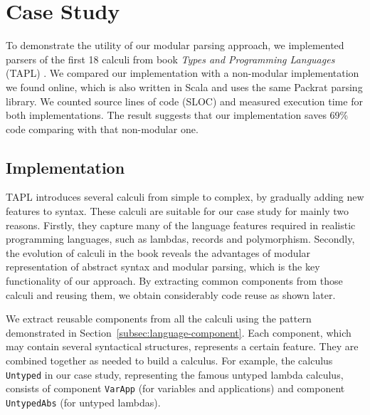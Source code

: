 \section{Case Study}\label{sec:casestudy}

To demonstrate the utility of our modular parsing approach, we
implemented parsers of the first 18 calculi from book \textit{Types and Programming Languages} (TAPL) \cite{pierce2002types}. We compared our implementation with a non-modular implementation
we found online, which is also written in Scala and uses the same Packrat parsing library.
We counted source lines of code (SLOC) and measured execution time for both implementations.
The result suggests that our implementation saves 69\% code comparing with that non-modular one.

\subsection{Implementation}\label{subsec:implementation}

TAPL introduces several calculi from simple to complex, by gradually adding new features to syntax.
These calculi are suitable for our case study for mainly two reasons. Firstly, they capture many of the language features
required in realistic programming languages, such as lambdas, records and polymorphism.
Secondly, the evolution of calculi in the book reveals the advantages of modular representation
of abstract syntax and modular parsing, which is the key functionality
of our approach. By extracting common components from those calculi
and reusing them, we obtain considerably code reuse as shown later.

We extract reusable components from all the calculi using the pattern
demonstrated in Section~\ref{subsec:language-component}. Each
component, which may contain several syntactical structures,
represents a certain feature. They are combined together as needed to
build a calculus. For example, the calculus \lstinline{Untyped} in our case study,
representing the famous untyped lambda calculus, consists of component
\lstinline{VarApp} (for variables and applications)
and component \lstinline{UntypedAbs} (for untyped lambdas).


